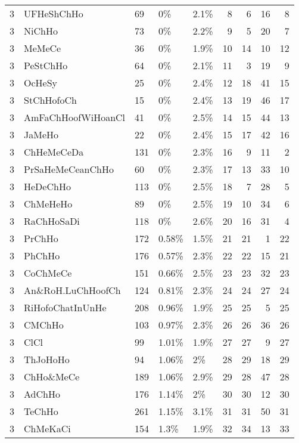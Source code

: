 \begin{longtable}{lllllrrrr}
  3 & UFHeShChHo & 69 & 0\% & 2.1\% &   8 &   6 &  16 &   8 \\ 
  3 & NiChHo & 73 & 0\% & 2.2\% &   9 &   5 &  20 &   7 \\ 
  3 & MeMeCe & 36 & 0\% & 1.9\% &  10 &  14 &  10 &  12 \\ 
  3 & PeStChHo & 64 & 0\% & 2.1\% &  11 &   3 &  19 &   9 \\ 
  3 & OcHeSy & 25 & 0\% & 2.4\% &  12 &  18 &  41 &  15 \\ 
  3 & StChHofoCh & 15 & 0\% & 2.4\% &  13 &  19 &  46 &  17 \\ 
  3 & AmFaChHoofWiHoanCl & 41 & 0\% & 2.5\% &  14 &  15 &  44 &  13 \\ 
  3 & JaMeHo & 22 & 0\% & 2.4\% &  15 &  17 &  42 &  16 \\ 
  3 & ChHeMeCeDa & 131 & 0\% & 2.3\% &  16 &   9 &  11 &   2 \\ 
  3 & PrSaHeMeCeanChHo & 60 & 0\% & 2.3\% &  17 &  13 &  33 &  10 \\ 
  3 & HeDeChHo & 113 & 0\% & 2.5\% &  18 &   7 &  28 &   5 \\ 
  3 & ChMeHeHo & 89 & 0\% & 2.5\% &  19 &  10 &  34 &   6 \\ 
  3 & RaChHoSaDi & 118 & 0\% & 2.6\% &  20 &  16 &  31 &   4 \\ 
  3 & PrChHo & 172 & 0.58\% & 1.5\% &  21 &  21 &   1 &  22 \\ 
  3 & PhChHo & 176 & 0.57\% & 2.3\% &  22 &  22 &  15 &  21 \\ 
  3 & CoChMeCe & 151 & 0.66\% & 2.5\% &  23 &  23 &  32 &  23 \\ 
  3 & An\&RoH.LuChHoofCh & 124 & 0.81\% & 2.3\% &  24 &  24 &  27 &  24 \\ 
  3 & RiHofoChatInUnHe & 208 & 0.96\% & 1.9\% &  25 &  25 &   5 &  25 \\ 
  3 & CMChHo & 103 & 0.97\% & 2.3\% &  26 &  26 &  36 &  26 \\ 
  3 & ClCl & 99 & 1.01\% & 1.9\% &  27 &  27 &   9 &  27 \\ 
  3 & ThJoHoHo & 94 & 1.06\% & 2\% &  28 &  29 &  18 &  29 \\ 
  3 & ChHo\&MeCe & 189 & 1.06\% & 2.9\% &  29 &  28 &  47 &  28 \\ 
  3 & AdChHo & 176 & 1.14\% & 2\% &  30 &  30 &  12 &  30 \\ 
  3 & TeChHo & 261 & 1.15\% & 3.1\% &  31 &  31 &  50 &  31 \\ 
  3 & ChMeKaCi & 154 & 1.3\% & 1.9\% &  32 &  34 &  13 &  33 \\ 

\end{longtable}
